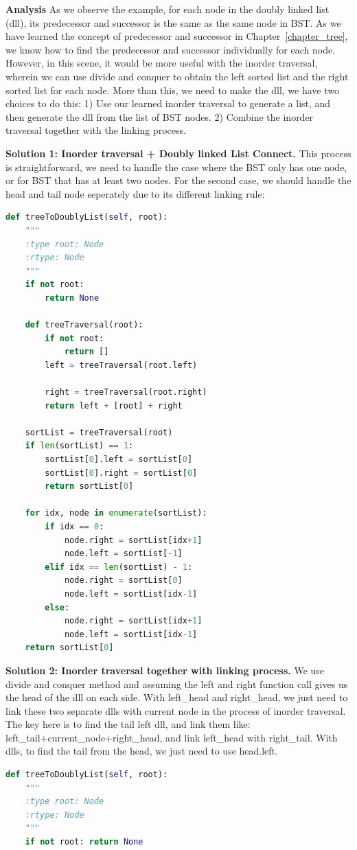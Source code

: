 \documentclass[../main.tex]{subfiles}
\begin{document}
\begin{examples}[resume]
\textbf{Analysis} As we observe the example, for each node in the doubly linked list (dll), its predecessor and successor is the same as the same node in BST. As we have learned the concept of predecessor and successor in Chapter~\ref{chapter_tree}, we know how to find the predecessor and successor individually for each node. However, in this scene, it would be more useful with the inorder traversal, wherein we can use divide and conquer to obtain the left sorted list and the right sorted list for each node. More than this, we need to make the dll, we have two choices to do this: 1) Use our learned inorder traversal to generate a list, and then generate the dll from the list of BST nodes. 2) Combine the inorder traversal together with the linking process.

\textbf{Solution 1: Inorder traversal + Doubly linked List Connect.} This process is straightforward, we need to handle the case where the BST only has one node, or for BST that has at least two nodes. For the second case, we should handle the head and tail node seperately due to its different linking rule:
\begin{lstlisting}[language=Python]
def treeToDoublyList(self, root):
    """
    :type root: Node
    :rtype: Node
    """
    if not root:
        return None
    
    def treeTraversal(root):
        if not root:
            return []          
        left = treeTraversal(root.left)

        right = treeTraversal(root.right)          
        return left + [root] + right
    
    sortList = treeTraversal(root)
    if len(sortList) == 1:
        sortList[0].left = sortList[0]
        sortList[0].right = sortList[0]
        return sortList[0]
    
    for idx, node in enumerate(sortList):
        if idx == 0:
            node.right = sortList[idx+1]
            node.left = sortList[-1]
        elif idx == len(sortList) - 1:
            node.right = sortList[0]
            node.left = sortList[idx-1]
        else:
            node.right = sortList[idx+1]
            node.left = sortList[idx-1]
    return sortList[0] 
\end{lstlisting}

\textbf{Solution 2: Inorder traversal together with linking process.} We use divide and conquer method and assuming the left and right function call gives us the head of the dll on each side. With left\_head and right\_head, we just need to link these two separate dlls with current node in the process of inorder traversal.  The key here is to find the tail left dll, and link them like: left\_tail+current\_node+right\_head, and link left\_head with right\_tail. With dlls, to find the tail from the head, we just need to use head.left. 
\begin{lstlisting}[language=Python]
def treeToDoublyList(self, root):
    """
    :type root: Node
    :rtype: Node
    """
    if not root: return None
    

\end{lstlisting}
\end{examples}
\end{document}
